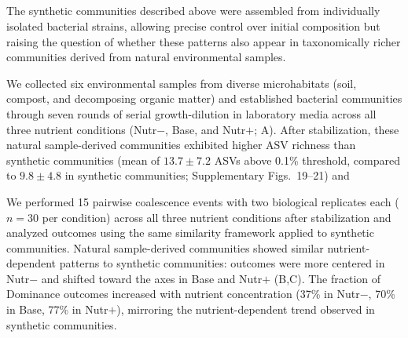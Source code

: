 \subsection{\texorpdfstring{}{Nutrient-dependent coalescence outcomes in natural sample-derived communities}}
\label{sec:results:natural_communities}

The synthetic communities described above were assembled from individually isolated bacterial strains, allowing precise control over initial composition but raising the question of whether these patterns also appear in taxonomically richer communities derived from natural environmental samples. 

We collected six environmental samples from diverse microhabitats (soil, compost, and decomposing organic matter) and established bacterial communities through seven rounds of serial growth-dilution in laboratory media across all three nutrient conditions (Nutr$-$, Base, and Nutr$+$; A). After stabilization, these natural sample-derived communities exhibited higher ASV richness than synthetic communities (mean of $13.7 \pm 7.2$ ASVs above 0.1\% threshold, compared to $9.8 \pm 4.8$ in synthetic communities; Supplementary Figs.~19--21) and 

We performed 15 pairwise coalescence events with two biological replicates each ($n = 30$ per condition) across all three nutrient conditions after stabilization and analyzed outcomes using the same similarity framework applied to synthetic communities. Natural sample-derived communities showed similar nutrient-dependent patterns to synthetic communities: outcomes were more centered in Nutr$-$ and shifted toward the axes in Base and Nutr$+$ (B,C). The fraction of Dominance outcomes increased with nutrient concentration (37\% in Nutr$-$, 70\% in Base, 77\% in Nutr$+$), mirroring the nutrient-dependent trend observed in synthetic communities. 

